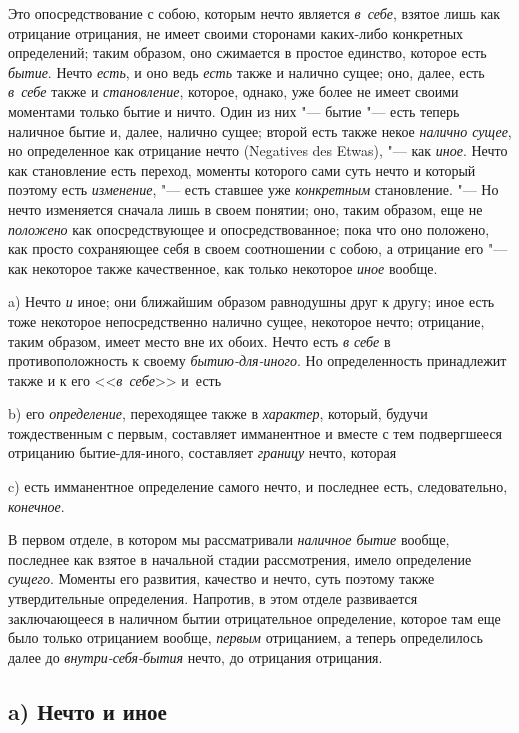 Это опосредствование с собою, которым нечто является {\em в~себе}, взятое лишь
как отрицание отрицания, не имеет своими сторонами каких-либо конкретных
определений; таким образом, оно сжимается в простое единство, которое есть
{\em бытие}. Нечто {\em есть}, и оно ведь {\em есть} также и налично сущее;
оно, далее, есть {\em в~себе} также и {\em становление}, которое, однако, уже
более не имеет своими моментами только бытие и ничто. Один из них "--- бытие
"--- есть теперь наличное бытие и, далее, налично сущее; второй есть также
некое {\em налично сущее}, но определенное как отрицание нечто (Nega\-tives des
Etwas), "--- как {\em иное}. Нечто как становление есть переход, моменты
которого сами суть нечто и который поэтому есть {\em изменение}, "--- есть
ставшее уже {\em конкретным} становление. "--- Но нечто изменяется сначала лишь
в своем понятии; оно, таким образом, еще не {\em положено} как опосредствующее
и опосредствованное; пока что оно положено, как просто сохраняющее себя в своем
соотношении с собою, а отрицание его "--- как некоторое также качественное, как
только некоторое {\em иное} вообще.


a) Нечто {\em и} иное; они ближайшим образом равнодушны друг к другу; иное есть
тоже некоторое непосредственно налично сущее, некоторое нечто; отрицание, таким
образом, имеет место вне их обоих. Нечто есть {\em в себе} в противоположность
к своему {\em бытию-для-иного}. Но определенность принадлежит также и к его
<<{\em в~себе}>> и~есть

b) его {\em определение}, переходящее также в {\em характер}, который, будучи
тождественным с первым, составляет имманентное и вместе с тем подвергшееся
отрицанию бытие-для-иного, составляет {\em границу} нечто, которая

c) есть имманентное определение самого нечто, и последнее есть,
следовательно, {\em конечное}.

В первом отделе, в котором мы рассматривали {\em наличное бытие} вообще,
последнее как взятое в начальной стадии рассмотрения, имело определение
{\em сущего}. Моменты его развития, качество и нечто, суть поэтому также
утвердительные определения. Напротив, в этом отделе развивается заключающееся
в наличном бытии отрицательное определение, которое там еще было только
отрицанием вообще, {\em первым} отрицанием, а теперь определилось далее до
{\em внутри-себя-бытия} нечто, до отрицания отрицания.

\subsection[a) Нечто и иное]{a) Нечто и иное}

